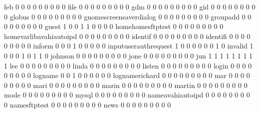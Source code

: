 \documentclass[compress,8pt]{beamer}
\begin{document}
\begin{frame}
\begin{Schunk}
  feb                                        0   0   0   0   0   0   0   0   0
  file                                       0   0   0   0   0   0   0   0   0
  gdm                                        0   0   0   0   0   0   0   0   0
  gid                                        0   0   0   0   0   0   0   0   0
  globus                                     0   0   0   0   0   0   0   0   0
  gnomescreensaverdialog                     0   0   0   0   0   0   0   0   0
  groupadd                                   0   0   0   0   0   0   0   0   0
  guest                                      1   0   0   1   1   0   0   0   0
  homehomesftptest                           0   0   0   0   0   0   0   0   0
  homevarlibavahiautoipd                     0   0   0   0   0   0   0   0   0
  identif                                    0   0   0   0   0   0   0   0   0
  identifi                                   0   0   0   0   0   0   0   0   0
  inform                                     0   0   0   1   0   0   0   0   0
  inputuserauthrequest                       1   0   0   0   0   0   0   1   0
  invalid                                    1   0   0   0   1   0   1   1   0
  johnson                                    0   0   0   0   0   0   0   0   0
  jone                                       0   0   0   0   0   0   0   0   0
  jun                                        1   1   1   1   1   1   1   1   1
  lee                                        0   0   0   0   0   0   0   0   0
  linda                                      0   0   0   0   0   0   0   0   0
  listen                                     0   0   0   0   0   0   0   0   0
  login                                      0   0   0   0   0   0   0   0   0
  logname                                    0   0   1   0   0   0   0   0   0
  lognamerichard                             0   0   0   0   0   0   0   0   0
  mar                                        0   0   0   0   0   0   0   0   0
  mari                                       0   0   0   0   0   0   0   0   0
  marin                                      0   0   0   0   0   0   0   0   0
  martin                                     0   0   0   0   0   0   0   0   0
  mode                                       0   0   0   0   0   0   0   0   0
  mysql                                      0   0   0   0   0   0   0   0   0
  nameavahiautoipd                           0   0   0   0   0   0   0   0   0
  namesftptest                               0   0   0   0   0   0   0   0   0
  news                                       0   0   0   0   0   0   0   0   0

\end{Schunk}
\end{frame}
\end{document}
